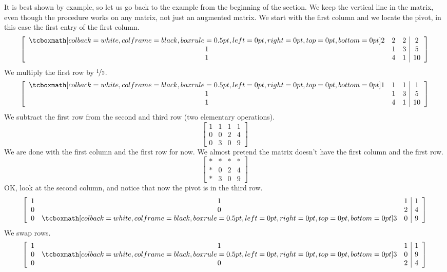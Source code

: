 It is best shown by example, so let us go back to the 
example from the beginning of the section.
We keep the vertical line in the matrix,
even though the procedure works on any matrix, not just
an augmented matrix.
We start with the first column and we locate the pivot, in this
case the first entry of the first column.
\begin{equation*}
\left[
\begin{array}{ccc|c}
\mybxsm{2} & 2 & 2 & 2 \\
1 & 1 & 3 & 5 \\
1 & 4 & 1 & 10
\end{array}
\right]
\end{equation*}
We multiply the first row by
$\nicefrac{1}{2}$.
\begin{equation*}
\left[
\begin{array}{ccc|c}
\mybxsm{1} & 1 & 1 & 1 \\
1 & 1 & 3 & 5 \\
1 & 4 & 1 & 10
\end{array}
\right]
\end{equation*}
We subtract the first row from the second and third row (two elementary
operations).
\begin{equation*}
\left[
\begin{array}{ccc|c}
1 & 1 & 1 & 1 \\
0 & 0 & 2 & 4 \\
0 & 3 & 0 & 9
\end{array}
\right]
\end{equation*}
We are done with the first column and the first row for now.  We almost
pretend the matrix doesn't have the first column and the first row.
\begin{equation*}
\left[
\begin{array}{ccc|c}
* & * & * & * \\
* & 0 & 2 & 4 \\
* & 3 & 0 & 9
\end{array}
\right]
\end{equation*}
OK\@, look at the second column, and notice that now the pivot is in the
third row.
\begin{equation*}
\left[
\begin{array}{ccc|c}
1 & 1 & 1 & 1 \\
0 & 0 & 2 & 4 \\
0 & \mybxsm{3} & 0 & 9
\end{array}
\right]
\end{equation*}
We swap rows.
\begin{equation*}
\left[
\begin{array}{ccc|c}
1 & 1 & 1 & 1 \\
0 & \mybxsm{3} & 0 & 9 \\
0 & 0 & 2 & 4
\end{array}
\right]
\end{equation*}
